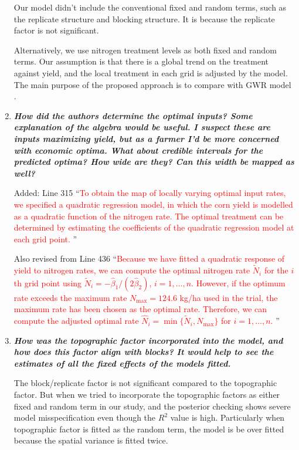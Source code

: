 \documentclass[a4paper]{article}   	%
\newcommand{\qtitle}[1]{\textit{\textbf{#1}}}
\begin{document}
\begin{enumerate}
    Our model didn't include the conventional fixed and random terms, such as the replicate structure and blocking structure. It is because the replicate factor is not significant. 
    
    Alternatively, we use nitrogen treatment levels as both fixed and random terms. Our assumption is that there is a global trend on the treatment against yield, and the local treatment in each grid is adjusted by the model. The main purpose of the proposed approach is to compare with GWR model \parencite{Rakshit2020Novel}.

    \item \qtitle{How did the authors determine the optimal inputs? Some explanation of the algebra would be useful. I suspect these are inputs maximizing yield, but as a farmer I'd be more concerned with economic optima. What about credible intervals for the predicted optima? How wide are they? Can this width be mapped as well?}

    Added: Line 315 ``\textcolor{red}{To obtain the map of locally varying optimal input rates, we specified a quadratic regression model, in which the corn yield is modelled as a quadratic function of the nitrogen rate. The optimal treatment can be determined by estimating the coefficients of the quadratic regression model at each grid point.} ''
    
    Also revised from Line 436 ``\textcolor{red}{Because we have fitted a quadratic response of yield to nitrogen rates, we can compute the optimal nitrogen rate $\tilde{N}_{i}$ for the $i$th grid point using $\tilde{N}_{i} = -\hat{\beta}_{1}/(2\hat{\beta}_{2})$, $i=1,\ldots,n$. However, if the optimum rate exceeds the maximum rate $N_{\mbox{max}} = 124.6$ kg/ha used in the trial, the maximum rate has been chosen as the optimal rate. Therefore, we can compute the adjusted optimal rate $\hat{N}_i = \min\{ \tilde{N}_i, N_{\mbox{max}}\}$ for $i=1,\ldots,n$. }''

    \item \qtitle{How was the topographic factor incorporated into the model, and how does this factor align with blocks? It would help to see the estimates of all the fixed effects of the models fitted.}

    The block/replicate factor is not significant compared to the topographic factor. But when we tried to incorporate the topographic factors as either fixed and random term in our study, and the posterior checking shows severe model misspecification even though the $R^2$ value is high. Particularly when topographic factor is fitted as the random term, the model is be over fitted because the spatial variance is fitted twice. 
    

\end{enumerate}
\end{document}
